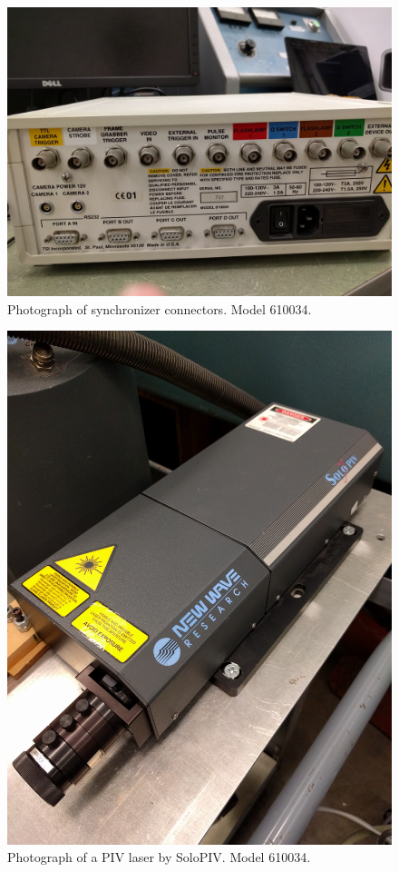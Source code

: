 \begin{figure}[H]
	\centering
	\includegraphics[width=5in]{figs/piv_method/synchronizer_rear}
	\caption{Photograph of synchronizer connectors. Model 610034.}
	\label{fig:synchronizer2}
\end{figure}

\begin{figure}[H]
	\centering
	\includegraphics[width=5in]{figs/piv_method/laser}
	\caption{Photograph of a PIV laser by SoloPIV. Model 610034.}
	\label{fig:laser}
\end{figure}

